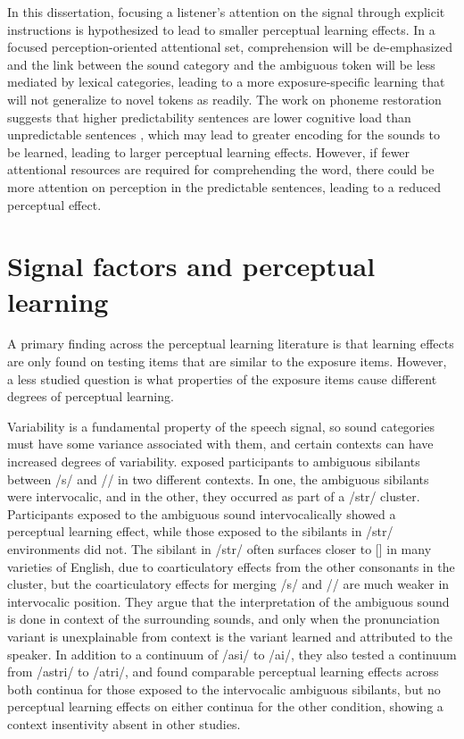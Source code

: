In this dissertation, focusing a listener's attention on the signal through explicit instructions is hypothesized to lead to smaller perceptual learning effects.
In a focused perception-oriented attentional set, comprehension will be de-emphasized and the link between the sound category and the ambiguous token will be less mediated by lexical categories, leading to a more exposure-specific learning that will not generalize to novel tokens as readily.
The work on phoneme restoration suggests that higher predictability sentences are lower cognitive load than unpredictable sentences \citep{Samuel1981}, which may lead to greater encoding for the sounds to be learned, leading to larger perceptual learning effects.
However, if fewer attentional resources are required for comprehending the word, there could be more attention on perception in the predictable sentences, leading to a reduced perceptual effect.

\section{Signal factors and perceptual learning}
\label{sec:signal}

A primary finding across the perceptual learning literature is that learning effects are only found on testing items that are similar to the exposure items.  However, a less studied question is what properties of the exposure items cause different degrees of perceptual learning.  

Variability is a fundamental property of the speech signal, so sound categories must have some variance associated with them, and certain contexts can have increased degrees of variability.
\citet{Kraljic2008a} exposed participants to ambiguous sibilants between /s/ and /\textesh/ in two different contexts.  
In one, the ambiguous sibilants were intervocalic, and in the other, they occurred as part of a /str/ cluster.  
Participants exposed to the ambiguous sound intervocalically showed a perceptual learning effect, while those exposed to the sibilants in /str/ environments did not.  
The sibilant in /str/ often surfaces closer to [\textesh] in many varieties of English, due to coarticulatory effects from the other consonants in the cluster, but the coarticulatory effects for merging /s/ and /\textesh/ are much weaker in intervocalic position.  
They argue that the interpretation of the ambiguous sound is done in context of the surrounding sounds, and only when the pronunciation variant is unexplainable from context is the variant learned and attributed to the speaker\citet[see also][]{Kraljic2008}.  
In addition to a continuum of /asi/ to /a\textesh i/, they also tested a continuum from /astri/ to /a\textesh tri/, and found comparable perceptual learning effects across both continua for those exposed to the intervocalic ambiguous sibilants, but no perceptual learning effects on either continua for the other condition, showing a context insentivity absent in other studies.

